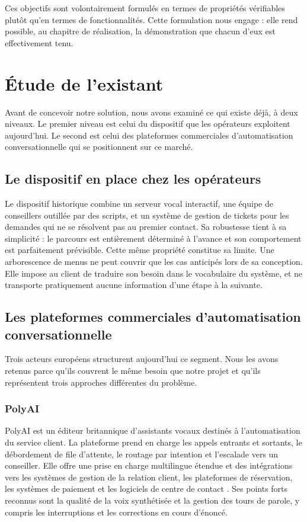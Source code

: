 Ces objectifs sont volontairement formulés en termes de propriétés vérifiables plutôt qu'en termes de fonctionnalités. Cette formulation nous engage : elle rend possible, au chapitre de réalisation, la démonstration que chacun d'eux est effectivement tenu.

\section{Étude de l'existant}

Avant de concevoir notre solution, nous avons examiné ce qui existe déjà, à deux niveaux. Le premier niveau est celui du dispositif que les opérateurs exploitent aujourd'hui. Le second est celui des plateformes commerciales d'automatisation conversationnelle qui se positionnent sur ce marché.

\subsection{Le dispositif en place chez les opérateurs}

Le dispositif historique combine un serveur vocal interactif, une équipe de conseillers outillée par des scripts, et un système de gestion de tickets pour les demandes qui ne se résolvent pas au premier contact. Sa robustesse tient à sa simplicité : le parcours est entièrement déterminé à l'avance et son comportement est parfaitement prévisible. Cette même propriété constitue sa limite. Une arborescence de menus ne peut couvrir que les cas anticipés lors de sa conception. Elle impose au client de traduire son besoin dans le vocabulaire du système, et ne transporte pratiquement aucune information d'une étape à la suivante.

\subsection{Les plateformes commerciales d'automatisation conversationnelle}

Trois acteurs européens structurent aujourd'hui ce segment. Nous les avons retenus parce qu'ils couvrent le même besoin que notre projet et qu'ils représentent trois approches différentes du problème.

\subsubsection{PolyAI}

PolyAI est un éditeur britannique d'assistants vocaux destinés à l'automatisation du service client. La plateforme prend en charge les appels entrants et sortants, le débordement de file d'attente, le routage par intention et l'escalade vers un conseiller. Elle offre une prise en charge multilingue étendue et des intégrations vers les systèmes de gestion de la relation client, les plateformes de réservation, les systèmes de paiement et les logiciels de centre de contact \cite{polyai}. Ses points forts reconnus sont la qualité de la voix synthétisée et la gestion des tours de parole, y compris les interruptions et les corrections en cours d'énoncé.

